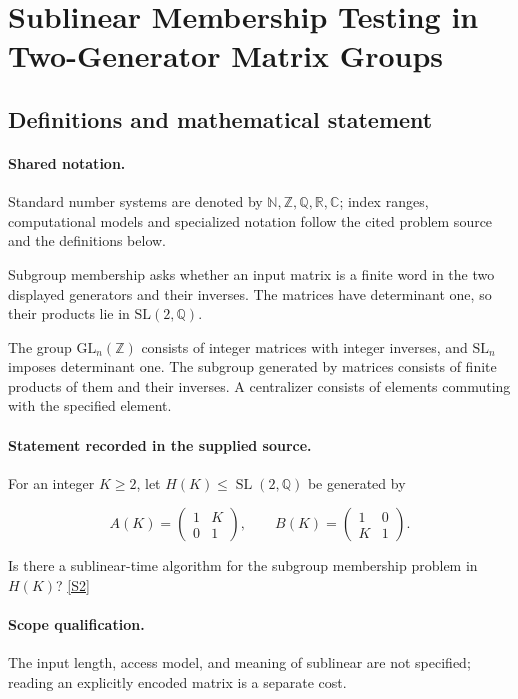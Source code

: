 \documentclass[11pt]{article}
\newcommand{\sref}[2]{\hyperlink{source:#1:#2}{[S#2]}}
\begin{document}
\section{Sublinear Membership Testing in Two-Generator Matrix Groups}\label{statement}

\subsection{Definitions and mathematical statement}

\paragraph{Shared notation.}Standard number systems are denoted by $\mathbb N,\mathbb Z,\mathbb Q,\mathbb R,\mathbb C$; index ranges, computational models and specialized notation follow the cited problem source and the definitions below.


Subgroup membership asks whether an input matrix is a finite word in the two displayed generators and their inverses. The matrices have determinant one, so their products lie in $\mathrm{SL}(2,\mathbb Q)$.

The group $\mathrm{GL}_n(\mathbb Z)$ consists of integer matrices with integer inverses, and $\mathrm{SL}_n$ imposes determinant one. The subgroup generated by matrices consists of finite products of them and their inverses. A centralizer consists of elements commuting with the specified element.
\paragraph{Statement recorded in the supplied source.}
For an integer $K\geq2$, let $H(K)\leq\operatorname{SL}(2,\mathbb Q)$ be generated by

$$A(K)=\begin{pmatrix}1&K\\0&1\end{pmatrix},\qquad B(K)=\begin{pmatrix}1&0\\K&1\end{pmatrix}.$$

Is there a sublinear-time algorithm for the subgroup membership problem in $H(K)$? \sref{statement}{2}
\paragraph{Scope qualification.}
The input length, access model, and meaning of sublinear are not specified; reading an explicitly encoded matrix is a separate cost.
\end{document}

